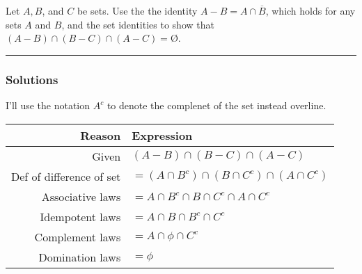 \newpage
\begin{question}
Let $A, B$, and $C$ be sets. Use the the identity $A-B = A \cap \overline{B}$, which holds for any sets $A$ and $B$, and the set identities to show that $(A−B)\cap (B−C)\cap(A−C) = \text{\O}$.
\end{question}

\par\noindent\rule{\textwidth}{0.5pt}

\subsubsection*{Solutions}

I'll use the notation $A^c$ to denote the complenet of the set instead overline.

\begin{center}

\begin{tabular}{rl}
    \hline
    \textbf{Reason} & \textbf{Expression} \\
    \hline\hline
    Given & $(A-B) \cap (B-C) \cap (A-C)$\\
    Def of difference of set & $=(A \cap B^c) \cap (B \cap C^c) \cap (A \cap C^c)$\\
    Associative laws & $=A \cap B^c \cap B \cap C^c \cap A \cap C^c$\\
    Idempotent laws & $=A \cap B \cap B^c \cap C^c$\\
    Complement laws & $=A \cap \phi \cap C^c$\\
    Domination laws & $=\phi$\\
    \hline
\end{tabular}

\end{center}